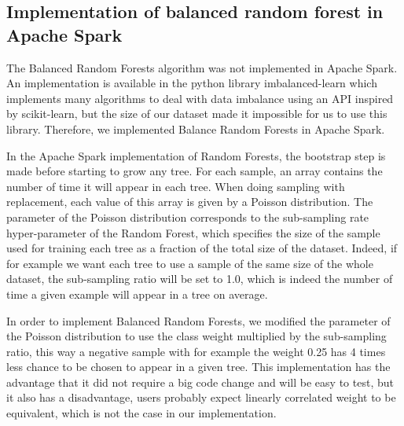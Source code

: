 \documentclass[conference]{IEEEtran}
\begin{document}
\subsection{Implementation of balanced random forest in Apache Spark}
The Balanced Random Forests algorithm was not implemented in Apache Spark.
An implementation is available in the python library imbalanced-learn\cite{imbalance} which implements many algorithms to deal with data imbalance using an API inspired by scikit-learn, but the size of our dataset made it impossible for us to use this library.
Therefore, we implemented Balance Random Forests in Apache Spark.

In the Apache Spark implementation of Random Forests, the bootstrap step is made before starting to grow any tree.
For each sample, an array contains the number of time it will appear in each tree.
When doing sampling with replacement, each value of this array is given by a Poisson distribution.
The parameter of the Poisson distribution corresponds to the sub-sampling rate hyper-parameter of the Random Forest, which specifies the size of the sample used for training each tree as a fraction of the total size of the dataset.
Indeed, if for example we want each tree to use a sample of the same size of the whole dataset, the sub-sampling ratio will be set to 1.0, which is indeed the number of time a given example will appear in a tree on average.

In order to implement Balanced Random Forests, we modified the parameter of the Poisson distribution to use the class weight multiplied by the sub-sampling ratio, this way a negative sample with for example the weight 0.25 has 4 times less chance to be chosen to appear in a given tree.
This implementation has the advantage that it did not require a big code change and will be easy to test, but it also has a disadvantage, users probably expect linearly correlated weight to be equivalent, which is not the case in our implementation.
	
\end{document}
